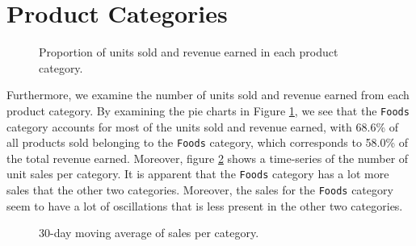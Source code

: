 \section{Product Categories}
\begin{figure}
    \vspace{-15pt}
    \centering
    \captionsetup{width=0.52\textwidth}
    \caption{Proportion of units sold and revenue earned in each product category.}
    \label{fig:sales_rev_cats}
    \vspace{-20pt}
\end{figure}
   
Furthermore, we examine the number of units sold and revenue earned from each product category.
By examining the pie charts in Figure \ref{fig:sales_rev_cats}, we see that the \texttt{Foods} category accounts for most of the units sold and revenue earned, with 68.6\% of all products sold belonging to the \texttt{Foods} category, which corresponds to 58.0\% of the total revenue earned.
Moreover, figure \ref{fig:cat_sales} shows a time-series of the number of unit sales per category.
It is apparent that the \texttt{Foods} category has a lot more sales that the other two categories.
Moreover, the sales for the \texttt{Foods} category seem to have a lot of oscillations that is less present in the other two categories.

\begin{figure}[b!]
    \centering
    \captionsetup{width=0.98\textwidth}
    \caption{30-day moving average of sales per category.}
    \label{fig:cat_sales}
\end{figure} 


